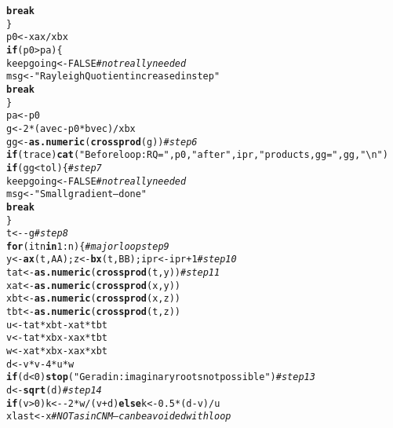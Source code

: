 \documentclass[10pt]{article}\usepackage[]{graphicx}\usepackage[]{color}
\makeatletter
\newcommand{\hlnum}[1]{\textcolor[rgb]{0.686,0.059,0.569}{#1}}%
\newcommand{\hlstr}[1]{\textcolor[rgb]{0.192,0.494,0.8}{#1}}%
\newcommand{\hlcom}[1]{\textcolor[rgb]{0.678,0.584,0.686}{\textit{#1}}}%
\newcommand{\hlopt}[1]{\textcolor[rgb]{0,0,0}{#1}}%
\newcommand{\hlstd}[1]{\textcolor[rgb]{0.345,0.345,0.345}{#1}}%
\newcommand{\hlkwa}[1]{\textcolor[rgb]{0.161,0.373,0.58}{\textbf{#1}}}%
\newcommand{\hlkwb}[1]{\textcolor[rgb]{0.69,0.353,0.396}{#1}}%
\newcommand{\hlkwd}[1]{\textcolor[rgb]{0.737,0.353,0.396}{\textbf{#1}}}%
\newenvironment{kframe}{%
 \def\at@end@of@kframe{}%
 \ifinner\ifhmode%
  \def\at@end@of@kframe{\end{minipage}}%
  \begin{minipage}{\columnwidth}%
 \fi\fi%
 \def\FrameCommand##1{\hskip\@totalleftmargin \hskip-\fboxsep
 \colorbox{shadecolor}{##1}\hskip-\fboxsep
     \hskip-\linewidth \hskip-\@totalleftmargin \hskip\columnwidth}%
 \MakeFramed {\advance\hsize-\width
   \@totalleftmargin\z@ \linewidth\hsize
   \@setminipage}}%
 {\par\unskip\endMakeFramed%
 \at@end@of@kframe}
\newenvironment{knitrout}{}{} %
\makeatother
\begin{document}
\begin{knitrout}
\begin{kframe}
\begin{alltt}
       \hlkwa{break}
    \hlstd{\}}
    \hlstd{p0}\hlkwb{<-}\hlstd{xax}\hlopt{/}\hlstd{xbx}
    \hlkwa{if} \hlstd{(p0}\hlopt{>}\hlstd{pa) \{}
       \hlstd{keepgoing}\hlkwb{<-}\hlnum{FALSE} \hlcom{# not really needed}
       \hlstd{msg}\hlkwb{<-}\hlstr{"Rayleigh Quotient increased in step"}
       \hlkwa{break}
    \hlstd{\}}
    \hlstd{pa}\hlkwb{<-}\hlstd{p0}
    \hlstd{g}\hlkwb{<-}\hlnum{2}\hlopt{*}\hlstd{(avec}\hlopt{-}\hlstd{p0}\hlopt{*}\hlstd{bvec)}\hlopt{/}\hlstd{xbx}
    \hlstd{gg}\hlkwb{<-}\hlkwd{as.numeric}\hlstd{(}\hlkwd{crossprod}\hlstd{(g))} \hlcom{# step 6}
    \hlkwa{if} \hlstd{(trace)} \hlkwd{cat}\hlstd{(}\hlstr{"Before loop: RQ="}\hlstd{,p0,}\hlstr{" after "}\hlstd{,ipr,}\hlstr{" products, gg="}\hlstd{,gg,}\hlstr{"\textbackslash{}n"}\hlstd{)}
    \hlkwa{if} \hlstd{(gg}\hlopt{<}\hlstd{tol) \{} \hlcom{# step 7}
       \hlstd{keepgoing}\hlkwb{<-}\hlnum{FALSE} \hlcom{# not really needed}
       \hlstd{msg}\hlkwb{<-}\hlstr{"Small gradient -- done"}
       \hlkwa{break}
    \hlstd{\}}
    \hlstd{t}\hlkwb{<-} \hlopt{-}\hlstd{g} \hlcom{# step 8}
    \hlkwa{for} \hlstd{(itn} \hlkwa{in} \hlnum{1}\hlopt{:}\hlstd{n) \{} \hlcom{# major loop step 9}
       \hlstd{y}\hlkwb{<-}\hlkwd{ax}\hlstd{(t, AA); z}\hlkwb{<-}\hlkwd{bx}\hlstd{(t, BB); ipr}\hlkwb{<-}\hlstd{ipr}\hlopt{+}\hlnum{1} \hlcom{# step 10}
       \hlstd{tat}\hlkwb{<-}\hlkwd{as.numeric}\hlstd{(}\hlkwd{crossprod}\hlstd{(t, y))} \hlcom{# step 11}
       \hlstd{xat}\hlkwb{<-}\hlkwd{as.numeric}\hlstd{(}\hlkwd{crossprod}\hlstd{(x, y))}
       \hlstd{xbt}\hlkwb{<-}\hlkwd{as.numeric}\hlstd{(}\hlkwd{crossprod}\hlstd{(x, z))}
       \hlstd{tbt}\hlkwb{<-}\hlkwd{as.numeric}\hlstd{(}\hlkwd{crossprod}\hlstd{(t, z))}
       \hlstd{u}\hlkwb{<-}\hlstd{tat}\hlopt{*}\hlstd{xbt}\hlopt{-}\hlstd{xat}\hlopt{*}\hlstd{tbt}
       \hlstd{v}\hlkwb{<-}\hlstd{tat}\hlopt{*}\hlstd{xbx}\hlopt{-}\hlstd{xax}\hlopt{*}\hlstd{tbt}
       \hlstd{w}\hlkwb{<-}\hlstd{xat}\hlopt{*}\hlstd{xbx}\hlopt{-}\hlstd{xax}\hlopt{*}\hlstd{xbt}
       \hlstd{d}\hlkwb{<-}\hlstd{v}\hlopt{*}\hlstd{v}\hlopt{-}\hlnum{4}\hlopt{*}\hlstd{u}\hlopt{*}\hlstd{w}
       \hlkwa{if} \hlstd{(d}\hlopt{<}\hlnum{0}\hlstd{)} \hlkwd{stop}\hlstd{(}\hlstr{"Geradin: imaginary roots not possible"}\hlstd{)} \hlcom{# step 13}
       \hlstd{d}\hlkwb{<-}\hlkwd{sqrt}\hlstd{(d)} \hlcom{# step 14}
       \hlkwa{if} \hlstd{(v}\hlopt{>}\hlnum{0}\hlstd{) k}\hlkwb{<-}\hlopt{-}\hlnum{2}\hlopt{*}\hlstd{w}\hlopt{/}\hlstd{(v}\hlopt{+}\hlstd{d)} \hlkwa{else} \hlstd{k}\hlkwb{<-}\hlnum{0.5}\hlopt{*}\hlstd{(d}\hlopt{-}\hlstd{v)}\hlopt{/}\hlstd{u}
       \hlstd{xlast}\hlkwb{<-}\hlstd{x} \hlcom{# NOT as in CNM -- can be avoided with loop}

\end{alltt}
\end{kframe}
\end{knitrout}
\end{document}
